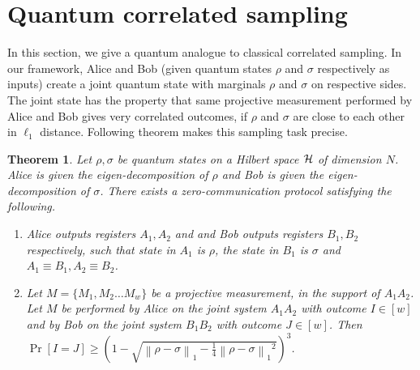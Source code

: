 \documentclass[11pt,a4paper]{article}
\def\H{\CMcal{H}}
\theoremstyle{plain}
\newtheorem{theorem}{Theorem}[section]
\theoremstyle{definition}
\newcommand {\norm} [1] {\ensuremath{ \left\| #1 \right\| }}
\newcommand {\normsub} [2] {\ensuremath{ \norm{#1}_{#2} }}
\newcommand {\onenorm} [1] {\normsub{#1}{1}}
\begin{document}
\section{Quantum correlated sampling}

In this section, we give a quantum analogue to classical correlated sampling. In our framework, Alice and Bob (given quantum states $\rho$ and $\sigma$ respectively as inputs) create a joint quantum state with marginals $\rho$ and $\sigma$ on respective sides. The joint state has the property that same projective measurement performed by Alice and Bob gives very correlated outcomes, if $\rho$ and $\sigma$ are close to each other in $\ell_1$ distance.  
 Following theorem makes this sampling task precise.  
\label{sec:qcorr}
\begin{theorem}\label{thm:correlatedsampling}
Let $\rho,\sigma$ be quantum states on a Hilbert space $\H$ of dimension $N$. Alice is given the eigen-decomposition of $\rho$ and Bob is given the eigen-decomposition of $\sigma$.  There exists a zero-communication  protocol satisfying the following.
\begin{enumerate}
\item Alice outputs registers  $A_1,A_2$ and and Bob outputs registers $B_1,B_2$ respectively, such that state in $A_1$ is $\rho$, the state in $B_1$ is $\sigma$ and $A_1\equiv B_1, A_2\equiv B_2$.
\item Let $M = \{M_1,M_2\ldots M_w\}$ be a projective measurement, in the support of $A_1A_2$. Let $M$ be performed by Alice on the joint system $A_1A_2$ with outcome $I \in [w]$ and by Bob on the joint system $B_1B_2$ with outcome $J \in [w]$. Then $\Pr[I = J] \geq \left(1-\sqrt{\onenorm{\rho-\sigma} - \frac{1}{4}\onenorm{\rho-\sigma}^2}\right)^{3}$. 
\end{enumerate}
\end{theorem}
\end{document}
